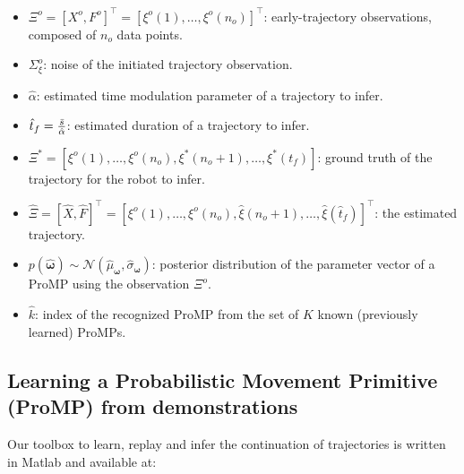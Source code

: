 \documentclass[utf8]{frontiersSCNS} %
\newcommand{\todo}[1]{\textcolor{red}{\textbf{/*#1*/}}}
\begin{document}
\begin{itemize}
	\item $\Xi^o =[X^o, F^o]^\top = [\xi^o(1),\ldots, \xi^o(n_o)]^\top$: early-trajectory observations, composed of $n_o$ data points.
	\item $\Sigma_\xi^o$: noise of the initiated trajectory observation.
	\item $\hat{\alpha}$: estimated time modulation parameter of a trajectory to infer.
	\item $\hat{t}_f ={\bar{s} \over \hat{\alpha}}$: estimated duration of a trajectory to infer.
	\item $\Xi^* = [\xi^o(1),\ldots, \xi^o(n_o), \xi^*(n_o+1),\ldots, \xi^*(t_f)]$: ground truth of the trajectory for the robot to infer.
	\item $\hat{\Xi} =[\hat{X}, \hat{F}]^\top = [\xi^o(1),\ldots, \xi^o(n_o), \hat{\xi}(n_o + 1),\ldots,\hat{\xi}(\hat{t}_f)]^\top$: the estimated trajectory.
	\item $p(\hat{\boldsymbol{\omega}}) \sim \mathcal{N}(\hat{\mu}_{\boldsymbol{\omega}}, \hat{\sigma}_{\boldsymbol{\omega}})$: posterior distribution of the parameter vector of a ProMP using the observation $\Xi^o$.
	
	
	\item $\hat{k}$: index of the recognized ProMP from the set of $K$ known (previously learned) ProMPs.
\end{itemize}


\subsection{Learning a Probabilistic Movement Primitive (ProMP) from demonstrations}
\label{LearningSimpleProMP}
Our toolbox to learn, replay and infer the continuation of trajectories is written in Matlab and available at:
\end{document}
